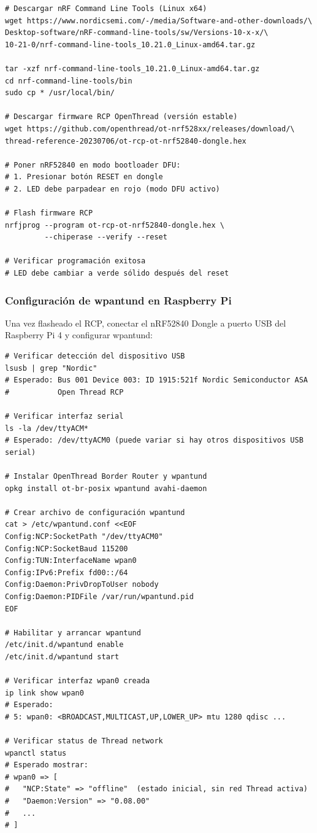 \begin{verbatim}
# Descargar nRF Command Line Tools (Linux x64)
wget https://www.nordicsemi.com/-/media/Software-and-other-downloads/\
Desktop-software/nRF-command-line-tools/sw/Versions-10-x-x/\
10-21-0/nrf-command-line-tools_10.21.0_Linux-amd64.tar.gz

tar -xzf nrf-command-line-tools_10.21.0_Linux-amd64.tar.gz
cd nrf-command-line-tools/bin
sudo cp * /usr/local/bin/

# Descargar firmware RCP OpenThread (versión estable)
wget https://github.com/openthread/ot-nrf528xx/releases/download/\
thread-reference-20230706/ot-rcp-ot-nrf52840-dongle.hex

# Poner nRF52840 en modo bootloader DFU:
# 1. Presionar botón RESET en dongle
# 2. LED debe parpadear en rojo (modo DFU activo)

# Flash firmware RCP
nrfjprog --program ot-rcp-ot-nrf52840-dongle.hex \
         --chiperase --verify --reset

# Verificar programación exitosa
# LED debe cambiar a verde sólido después del reset
\end{verbatim}

\subsubsection{Configuración de wpantund en Raspberry Pi}

Una vez flasheado el RCP, conectar el nRF52840 Dongle a puerto USB del Raspberry Pi 4 y configurar wpantund:

\begin{verbatim}
# Verificar detección del dispositivo USB
lsusb | grep "Nordic"
# Esperado: Bus 001 Device 003: ID 1915:521f Nordic Semiconductor ASA 
#           Open Thread RCP

# Verificar interfaz serial
ls -la /dev/ttyACM*
# Esperado: /dev/ttyACM0 (puede variar si hay otros dispositivos USB serial)

# Instalar OpenThread Border Router y wpantund
opkg install ot-br-posix wpantund avahi-daemon

# Crear archivo de configuración wpantund
cat > /etc/wpantund.conf <<EOF
Config:NCP:SocketPath "/dev/ttyACM0"
Config:NCP:SocketBaud 115200
Config:TUN:InterfaceName wpan0
Config:IPv6:Prefix fd00::/64
Config:Daemon:PrivDropToUser nobody
Config:Daemon:PIDFile /var/run/wpantund.pid
EOF

# Habilitar y arrancar wpantund
/etc/init.d/wpantund enable
/etc/init.d/wpantund start

# Verificar interfaz wpan0 creada
ip link show wpan0
# Esperado: 
# 5: wpan0: <BROADCAST,MULTICAST,UP,LOWER_UP> mtu 1280 qdisc ...

# Verificar status de Thread network
wpanctl status
# Esperado mostrar:
# wpan0 => [
#   "NCP:State" => "offline"  (estado inicial, sin red Thread activa)
#   "Daemon:Version" => "0.08.00"
#   ...
# ]
\end{verbatim}

